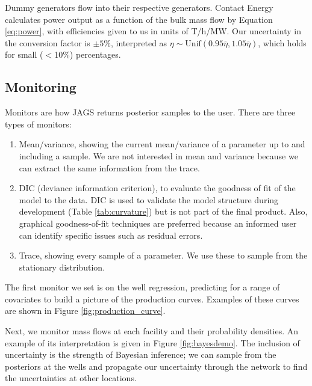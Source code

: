 \documentclass[a4paper, 12pt]{article}
\begin{document}
Dummy generators flow into their respective generators. Contact Energy calculates power output as a function of the bulk mass flow by Equation \ref{eq:power}, with efficiencies given to us in units of T/h/MW. Our uncertainty in the conversion factor is $\pm5\%$, interpreted as $\eta \sim \text{Unif}\left( 0.95\overline\eta, 1.05\overline\eta \right)$, which holds for small ($<$10\%) percentages.

\subsection{Monitoring}

Monitors are how JAGS returns posterior samples to the user. There are three types of monitors:

\begin{enumerate}
\item Mean/variance, showing the current mean/variance of a parameter up to and including a sample. We are not interested in mean and variance because we can extract the same information from the trace.
\item DIC (deviance information criterion), to evaluate the goodness of fit of the model to the data. DIC is used to validate the model structure during development (Table \ref{tab:curvature}) but is not part of the final product. Also, graphical goodness-of-fit techniques are preferred because an informed user can identify specific issues such as residual errors.
\item Trace, showing every sample of a parameter. We use these to sample from the stationary distribution.
\end{enumerate}

The first monitor we set is on the well regression, predicting for a range of covariates to build a picture of the production curves. Examples of these curves are shown in Figure \ref{fig:production_curve}.

Next, we monitor mass flows at each facility and their probability densities. An example of its interpretation is given in Figure \ref{fig:bayesdemo}. The inclusion of uncertainty is the strength of Bayesian inference; we can sample from the posteriors at the wells and propagate our uncertainty through the network to find the uncertainties at other locations.
\end{document}
